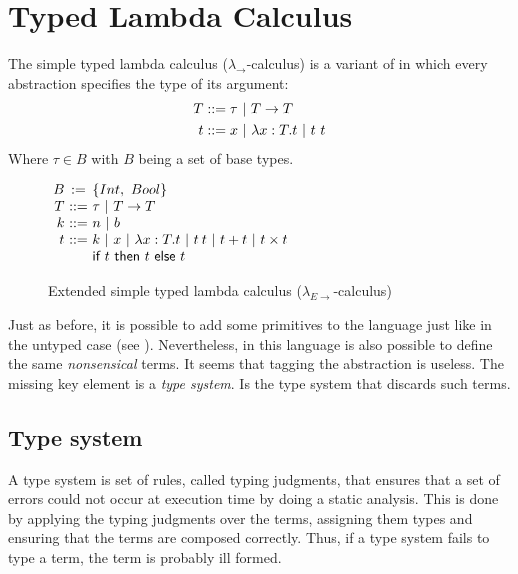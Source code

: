 \section{Typed Lambda Calculus}
\newcommand{\tlambdaCalc}{$\lambda_{\rightarrow}$-calculus}
\newcommand{\extTlambdaCalc}{$\lambda_{E\rightarrow}$-calculus}
The simple typed lambda calculus \cite{Church:lamdaTypeIntro} (\tlambdaCalc{})
is a variant of \lambdaCalc{} in which every abstraction specifies
the type of its argument:
\begin{align*}
    T & ::= \tau\ |\ \arrow{T}{T} \\
    t & ::= \x{}\ |\ \lambda x:T.t\ |\ t\ t
\end{align*}
Where $\tau \in B$ with $B$ being a set of base types.

\begin{figure}
    \centering
    $
    \begin{array}{@{\ } r @{\ } c @{\ } l}
        B &\termDef& \{Int,\ Bool\}\\
        T & ::=& \tau\ |\ \arrow{T}{T} \\
        k & ::=& n\ |\ b \\
        t & ::=& k\ |\ \x{}\ |\ \lambda x:T.t\ |\ \app{t}{t}\ |\ t+t\ |\ t\times t\ \\
          &    & \ifterm{t}{t}{t}
    \end{array}
    $
    \caption{Extended simple typed lambda calculus (\extTlambdaCalc{})}
    \label{fig:extTypedCalc}
\end{figure}

Just as before, it is possible to add some primitives to the language just like in the untyped case (see
).
Nevertheless, in this language is also possible to define the same \emph{nonsensical} terms. It seems that 
tagging the abstraction is useless. The missing key element is a \emph{type system}. Is the type 
system that discards such terms.

\subsection{Type system}
\label{TypeSystem}
A type system is set of rules, called typing judgments, that ensures that a set of errors could not occur 
at execution time by doing a static analysis.
This is done by applying the typing judgments
over the terms, assigning them types and ensuring that the terms are composed correctly. Thus, if a 
type system fails to type a term, the term is probably ill formed.


